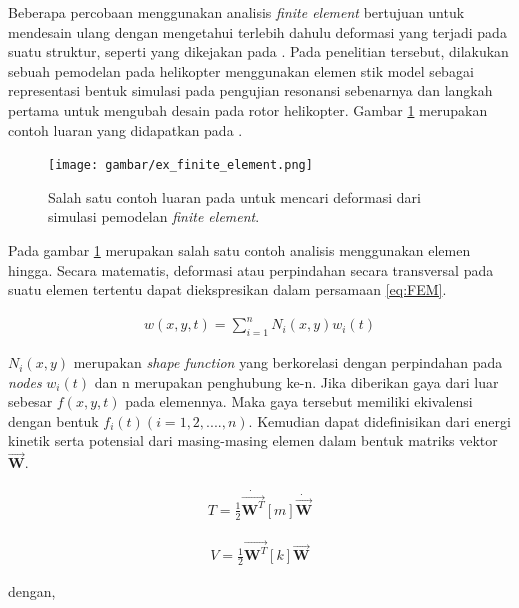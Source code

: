 Beberapa percobaan menggunakan analisis \textit{finite element} bertujuan untuk mendesain ulang dengan mengetahui terlebih dahulu deformasi yang terjadi pada suatu struktur, seperti yang dikejakan pada \cite{Gorecki2013}. Pada penelitian tersebut, dilakukan sebuah pemodelan pada helikopter menggunakan elemen stik model sebagai representasi bentuk simulasi pada pengujian resonansi sebenarnya dan langkah pertama untuk mengubah desain pada rotor helikopter. Gambar \ref{fig:ex_finite_element} merupakan contoh luaran yang didapatkan pada \cite{Gorecki2013}.

\begin{figure}[H]
	\centering
	\texttt{[image: gambar/ex\_finite\_element.png]}
	\caption{Salah satu contoh luaran pada \cite{Gorecki2013} untuk mencari deformasi dari simulasi pemodelan \textit{finite element}.}
	\label{fig:ex_finite_element}
\end{figure}

Pada gambar \ref{fig:ex_finite_element} merupakan salah satu contoh analisis menggunakan elemen hingga. Secara matematis, deformasi atau perpindahan secara transversal pada suatu elemen tertentu dapat diekspresikan dalam persamaan \ref{eq:FEM}.

\begin{align}
	\label{eq:FEM}
	w(x,y,t)=\sum_{i=1}^{n}N_i(x,y)w_i(t)
\end{align}

$N_i(x,y)$ merupakan \textit{shape function} yang berkorelasi dengan perpindahan pada \textit{nodes} $w_i(t)$ dan n merupakan penghubung ke-n. Jika diberikan gaya dari luar sebesar $f(x,y,t)$ pada elemennya. Maka gaya tersebut memiliki ekivalensi dengan bentuk $f_i(t)(i=1, 2, ...., n)$. Kemudian dapat didefinisikan dari energi kinetik serta potensial dari masing-masing elemen dalam bentuk matriks vektor ${\overrightarrow{\textbf{W}}}$. 

\begin{align}
	T=\frac{1}{2}\dot{\overrightarrow{\textbf{W}^T}}[m]\dot{\overrightarrow{\textbf{W}}}
	\label{eq:kinetik_FEM}
\end{align}

\begin{align}
	V=\frac{1}{2}\overrightarrow{\textbf{W}^T}[k]\overrightarrow{\textbf{W}}
	\label{eq:potensial_FEM}
\end{align}

dengan,

